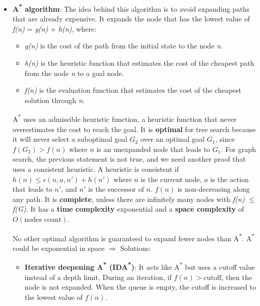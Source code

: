 \documentclass[12pt]{article}
\begin{document}
\begin{enumerate}[label=\textbf{IS.\arabic*}]
\begin{itemize}
              \item \textbf{A\textsuperscript{*} algorithm}: The idea behind this algorithm is to avoid expanding paths that are already expensive. It expands the node that has the lowest value of \textit{f(n)} = \textit{g(n)} + \textit{h(n)}, where:
                    \begin{itemize}
                        \item \textit{g(n)} is the cost of the path from the initial state to the node \textit{n}.
                        \item \textit{h(n)} is the heuristic function that estimates the cost of the cheapest path from the node \textit{n} to a goal node.
                        \item \textit{f(n)} is the evaluation function that estimates the cost of the cheapest solution through \textit{n}.
                    \end{itemize}
                    A\textsuperscript{*} uses an admissible heuristic function, a heuristic function that never overestimates the cost to reach the goal. It is \textbf{optimal} for tree search because it will never select a suboptimal goal $G_2$ over an optimal goal $G_1$, since $f(G_2) > f(n)$ where $n$ is an unexpanded node that leads to $G_1$. For graph search, the previous statement is not true, and we need another proof that uses a consistent heuristic. A heuristic is consistent if $h(n) \leq c(n,a,n') + h(n')$ where $n$ is the current node, $a$ is the action that leads to $n'$, and $n'$ is the successor of $n$. $f(n)$ is non-decreasing along any path. It is \textbf{complete}, unless there are infinitely many nodes with \textit{f(n)} $\leq$ \textit{f(G)}. It has a \textbf{time complexity} exponential and a \textbf{space complexity} of $O(\text{nodes count})$.

                    No other optimal algorithm is guaranteed to expand fewer nodes than A\textsuperscript{*}. A\textsuperscript{*} could be exponential in space $\Rightarrow$ Solutions:
                    \begin{itemize}
                        \item \textbf{Iterative deepening A\textsuperscript{*} (IDA\textsuperscript{*})}: It acts like A\textsuperscript{*} but uses a cutoff value instead of a depth limit. During an iteration, if $f(n) > \text{cutoff}$, then the node is not expanded. When the queue is empty, the cutoff is increased to the lowest value of $f(n)$.


\end{itemize}
\end{itemize}
\end{enumerate}
\end{document}
